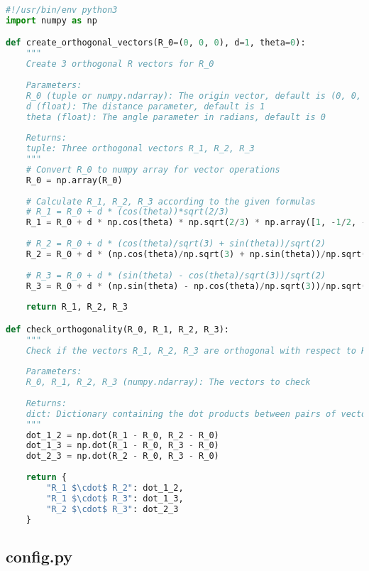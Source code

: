 \begin{lstlisting}[language=Python]
#!/usr/bin/env python3
import numpy as np

def create_orthogonal_vectors(R_0=(0, 0, 0), d=1, theta=0):
    """
    Create 3 orthogonal R vectors for R_0
    
    Parameters:
    R_0 (tuple or numpy.ndarray): The origin vector, default is (0, 0, 0)
    d (float): The distance parameter, default is 1
    theta (float): The angle parameter in radians, default is 0
    
    Returns:
    tuple: Three orthogonal vectors R_1, R_2, R_3
    """
    # Convert R_0 to numpy array for vector operations
    R_0 = np.array(R_0)
    
    # Calculate R_1, R_2, R_3 according to the given formulas
    # R_1 = R_0 + d * (cos(theta))*sqrt(2/3)
    R_1 = R_0 + d * np.cos(theta) * np.sqrt(2/3) * np.array([1, -1/2, -1/2])
    
    # R_2 = R_0 + d * (cos(theta)/sqrt(3) + sin(theta))/sqrt(2)
    R_2 = R_0 + d * (np.cos(theta)/np.sqrt(3) + np.sin(theta))/np.sqrt(2) * np.array([1, 1, 1])
    
    # R_3 = R_0 + d * (sin(theta) - cos(theta)/sqrt(3))/sqrt(2)
    R_3 = R_0 + d * (np.sin(theta) - np.cos(theta)/np.sqrt(3))/np.sqrt(2) * np.array([0, -1/2, 1/2]) * np.sqrt(2)
    
    return R_1, R_2, R_3

def check_orthogonality(R_0, R_1, R_2, R_3):
    """
    Check if the vectors R_1, R_2, R_3 are orthogonal with respect to R_0
    
    Parameters:
    R_0, R_1, R_2, R_3 (numpy.ndarray): The vectors to check
    
    Returns:
    dict: Dictionary containing the dot products between pairs of vectors
    """
    dot_1_2 = np.dot(R_1 - R_0, R_2 - R_0)
    dot_1_3 = np.dot(R_1 - R_0, R_3 - R_0)
    dot_2_3 = np.dot(R_2 - R_0, R_3 - R_0)
    
    return {
        "R_1 $\cdot$ R_2": dot_1_2,
        "R_1 $\cdot$ R_3": dot_1_3,
        "R_2 $\cdot$ R_3": dot_2_3
    }
\end{lstlisting}

\subsection{config.py}

